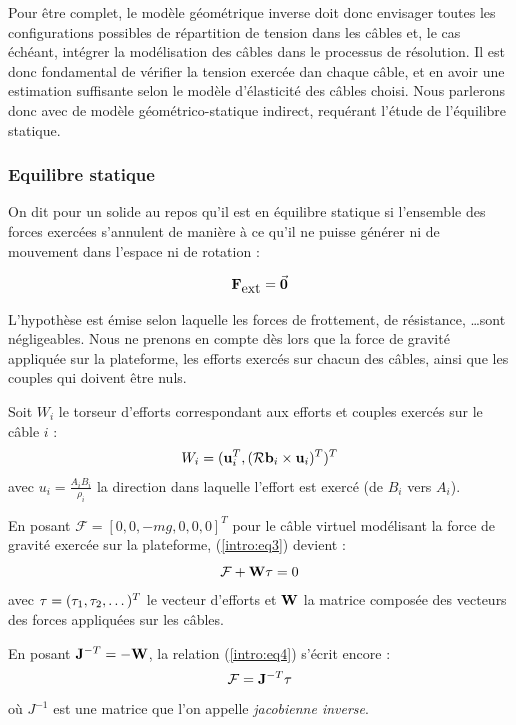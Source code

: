 Pour être complet, le modèle géométrique inverse doit donc envisager toutes les configurations possibles de répartition de tension dans les câbles et, le cas échéant, intégrer la modélisation des câbles dans le processus de résolution. Il est donc fondamental de vérifier la tension exercée dan chaque câble, et en avoir une estimation suffisante selon le modèle d'élasticité des câbles choisi. Nous parlerons donc avec \cite{Carricato-2010-06b} de modèle géométrico-statique indirect, requérant l'étude de l'équilibre statique.

\subsubsection{Equilibre statique}

On dit pour un solide au repos qu'il est en équilibre statique si l'ensemble des forces exercées s'annulent de manière à ce qu'il ne puisse générer ni de mouvement dans l'espace ni de rotation :

\begin{equation}
\mathcal {\bf F}_{\hbox{ext}} = \vec {\bf 0}
\label{intro:eq2}
\end{equation}

L'hypothèse est émise selon laquelle les forces de frottement, de résistance, \dots sont négligeables. Nous ne prenons en compte dès lors que la force de gravité appliquée sur la plateforme, les efforts exercés sur chacun des câbles, ainsi que les couples qui doivent être nuls.

Soit $W_i$ le torseur d'efforts correspondant aux efforts et couples exercés sur le câble $i$ :
\begin{equation}
W_i = ({\bf u}_i^T, (\mathcal R {\bf b}_i \times {\bf u}_i)^T)^T
\label{intro:eq3}
\end{equation}
avec $u_i = \frac{A_iB_i}{\rho_i}$ la direction dans laquelle l'effort est exercé (de $B_i$ vers $A_i$).

En posant $\mathcal F = [0, 0, -mg, 0, 0, 0]^T$ pour le câble virtuel modélisant la force de gravité exercée sur la plateforme, (\ref{intro:eq3}) devient :
\begin{equation}
\mathcal F + {\bf W} {\bf \tau} = 0
\label{intro:eq4}
\end{equation}
avec ${\bf \tau} = (\tau_1, \tau_2, \dots)^T$ le vecteur d'efforts et ${\bf W}$ la matrice composée des vecteurs des forces appliquées sur les câbles.

En posant ${\bf J}^{-T} = - {\bf W}$, la relation (\ref{intro:eq4}) s'écrit encore :
\begin{equation}
\mathcal F = {\bf J}^{-T} {\bf \tau}
\label{intro:eq5}
\end{equation}
où $J^{-1}$ est une matrice que l'on appelle {\it jacobienne inverse}.

